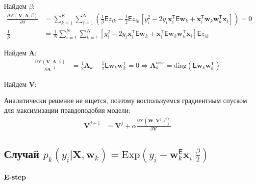\documentclass[12pt, twoside]{article}
\numberwithin{equation}{section}
\begin{document}
Найдем $\beta$:
\begin{equation}
\label{eq:st:14}
\begin{aligned}
\frac{\partial \mathcal{F}\left(\textbf{V}, \textbf{A}, \beta\right)}{\partial \beta} &= \sum_{k=1}^{K}\sum_{i=1}^{N}\left(\frac{1}{\beta}\mathsf{E}z_{ik}-\frac{1}{2}\mathsf{E}z_{ik}\left[y_{i}^{2}-2y_{i}\textbf{x}_{i}^{\mathsf{T}}\mathsf{E}\textbf{w}_{k}+\textbf{x}_{i}^{\mathsf{T}}\textbf{w}_{k}\textbf{w}_{k}^{\mathsf{T}}\textbf{x}_{i}\right]\right) = 0\\
\frac{1}{\beta}&=\frac{1}{N}\sum_{i=1}^{N}\sum_{k=1}^{K}\left[y_{i}^{2}-2y_{i}\textbf{x}_{i}^{\mathsf{T}}\mathsf{E}\textbf{w}_{k} + \textbf{x}_{i}^{\mathsf{T}}\mathsf{E}\textbf{w}_{k}\textbf{w}_{k}^{\mathsf{T}}\textbf{x}_{i}\right]\mathsf{E}z_{ik}
\end{aligned}
\end{equation}

Найдем $\textbf{A}$:
\begin{equation}
\label{eq:st:15}
\begin{aligned}
\frac{\partial \mathcal{F}\left(\textbf{V}, \textbf{A}, \beta\right)}{\partial \textbf{A}^{-1}} &= \frac{1}{2}\textbf{A}_{k} - \frac{1}{2}\mathsf{E}\textbf{w}_{k}\textbf{w}_{k}^{\mathsf{T}} = 0 \Rightarrow \textbf{A}_{k}^{new} = \text{diag}\left(\mathsf{E}\textbf{w}_{k}\textbf{w}_{k}^{\mathsf{T}}\right)
\end{aligned}
\end{equation}

Найдем $\textbf{V}$:

Аналитически решение не ищется, поэтому воспользуемся градиентным спуском для максимизации правдоподобия модели:
\begin{equation}
\label{eq:st:16}
\begin{aligned}
\textbf{V}^{j+1} &= \textbf{V}^{j} + \alpha\frac{\partial \mathcal{F}\left(\textbf{W}, \textbf{V}^{j}, \beta\right)}{\partial \textbf{V}} 
\end{aligned}
\end{equation}

\subsection{Случай $p_k\left(y_i|\textbf{X}, \textbf{w}_k\right) = \text{Exp}\left(y_{i}-\textbf{w}_{k}^{\mathsf{E}}\textbf{x}_{i}|\frac{\beta}{2}\right)$}

\paragraph{E-step}~
\end{document}
